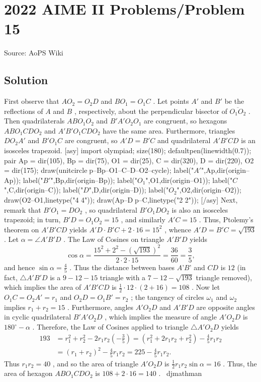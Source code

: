 \documentclass[12pt]{article}
\begin{document}
\section*{{2022 AIME II Problems/Problem 15}}
Source: AoPS Wiki

\subsection*{Solution}
First observe that $AO_2 = O_2D$ and $BO_1 = O_1C$ . Let points $A'$ and $B'$ be the reflections of $A$ and $B$ , respectively, about the perpendicular bisector of $\overline{O_1O_2}$ . Then quadrilaterals $ABO_1O_2$ and $B'A'O_2O_1$ are congruent, so hexagons $ABO_1CDO_2$ and $A'B'O_1CDO_2$ have the same area. Furthermore, triangles $DO_2A'$ and $B'O_1C$ are congruent, so $A'D = B'C$ and quadrilateral $A'B'CD$ is an isosceles trapezoid. [asy] import olympiad; size(180); defaultpen(linewidth(0.7)); pair Ap = dir(105), Bp = dir(75), O1 = dir(25), C = dir(320), D = dir(220), O2 = dir(175); draw(unitcircle^^Ap--Bp--O1--C--D--O2--cycle); label("$A'$",Ap,dir(origin--Ap)); label("$B'$",Bp,dir(origin--Bp)); label("$O_1$",O1,dir(origin--O1)); label("$C$",C,dir(origin--C)); label("$D$",D,dir(origin--D)); label("$O_2$",O2,dir(origin--O2)); draw(O2--O1,linetype("4 4")); draw(Ap--D^^Bp--C,linetype("2 2")); [/asy] Next, remark that $B'O_1 = DO_2$ , so quadrilateral $B'O_1DO_2$ is also an isosceles trapezoid; in turn, $B'D = O_1O_2 = 15$ , and similarly $A'C = 15$ . Thus, Ptolemy's theorem on $A'B'CD$ yields $A'D\cdot B'C + 2\cdot 16 = 15^2$ , whence $A'D = B'C = \sqrt{193}$ . Let $\alpha = \angle A'B'D$ . The Law of Cosines on triangle $A'B'D$ yields \[\cos\alpha = \frac{15^2 + 2^2 - (\sqrt{193})^2}{2\cdot 2\cdot 15} = \frac{36}{60} = \frac 35,\] and hence $\sin\alpha = \tfrac 45$ . Thus the distance between bases $A’B’$ and $CD$ is $12$ (in fact, $\triangle A'B'D$ is a $9-12-15$ triangle with a $7-12-\sqrt{193}$ triangle removed), which implies the area of $A'B'CD$ is $\tfrac12\cdot 12\cdot(2+16) = 108$ . Now let $O_1C = O_2A' = r_1$ and $O_2D = O_1B' = r_2$ ; the tangency of circles $\omega_1$ and $\omega_2$ implies $r_1 + r_2 = 15$ . Furthermore, angles $A'O_2D$ and $A'B'D$ are opposite angles in cyclic quadrilateral $B'A'O_2D$ , which implies the measure of angle $A'O_2D$ is $180^\circ - \alpha$ . Therefore, the Law of Cosines applied to triangle $\triangle A'O_2D$ yields \begin{align*} 193 &= r_1^2 + r_2^2 - 2r_1r_2(-\tfrac 35) = (r_1^2 + 2r_1r_2 + r_2^2) - \tfrac45r_1r_2\\ &= (r_1+r_2)^2 - \tfrac45 r_1r_2 = 225 - \tfrac45r_1r_2. \end{align*} Thus $r_1r_2 = 40$ , and so the area of triangle $A'O_2D$ is $\tfrac12r_1r_2\sin\alpha = 16$ . Thus, the area of hexagon $ABO_{1}CDO_{2}$ is $108 + 2\cdot 16 = \boxed{140}$ . ~djmathman
\end{document}

